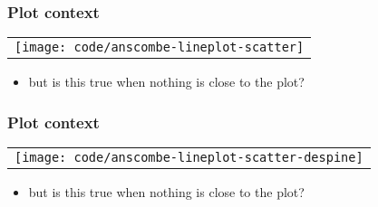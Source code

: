 \documentclass{beamer}
\begin{document}
\begin{frame}
\frametitle{Plot context}
\begin{tabular}{c}
\\
\texttt{[image: code/anscombe-lineplot-scatter]}
\end{tabular}
\begin{itemize}
\item but is this true when nothing is close to the plot?
\end{itemize}
\end{frame}

\begin{frame}
\frametitle{Plot context}
\begin{tabular}{c}
\\
\texttt{[image: code/anscombe-lineplot-scatter-despine]}
\end{tabular}
\begin{itemize}
\item but is this true when nothing is close to the plot?
\end{itemize}
\end{frame}
\end{document}
